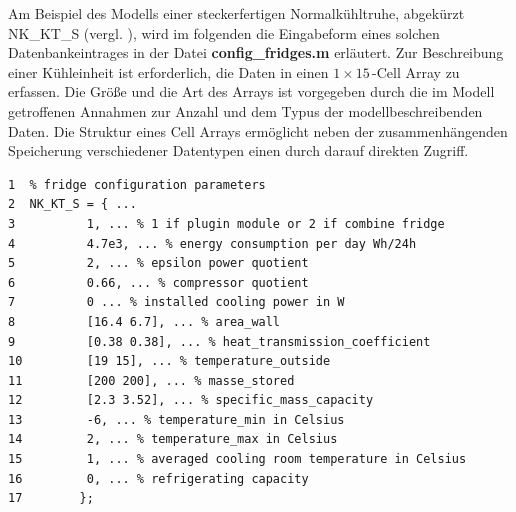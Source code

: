 Am Beispiel des Modells einer steckerfertigen
Normalkühltruhe, abgekürzt NK\_KT\_S (vergl.
), wird im folgenden die Eingabeform eines solchen
Datenbankeintrages in der Datei \textbf{config\_fridges.m} erläutert. Zur
Beschreibung einer Kühleinheit ist erforderlich, die Daten in einen
$1\times15\,$-Cell Array zu erfassen.  Die Größe und die Art des Arrays ist
vorgegeben durch die im Modell getroffenen Annahmen zur
Anzahl und dem Typus der modellbeschreibenden Daten. Die Struktur eines Cell
Arrays ermöglicht neben der zusammenhängenden Speicherung verschiedener
Datentypen einen durch \matlab darauf direkten Zugriff.

\begin{lstlisting}[caption=config\_fridges.m,label={fridge}]
1  % fridge configuration parameters
2  NK_KT_S = { ...
3          1, ... % 1 if plugin module or 2 if combine fridge
4          4.7e3, ... % energy consumption per day Wh/24h
5          2, ... % epsilon power quotient
6          0.66, ... % compressor quotient
7          0 ... % installed cooling power in W
8          [16.4 6.7], ... % area_wall
9          [0.38 0.38], ... % heat_transmission_coefficient
10         [19 15], ... % temperature_outside
11         [200 200], ... % masse_stored
12         [2.3 3.52], ... % specific_mass_capacity
13         -6, ... % temperature_min in Celsius
14         2, ... % temperature_max in Celsius
15         1, ... % averaged cooling room temperature in Celsius
16         0, ... % refrigerating capacity
17        };
\end{lstlisting}

